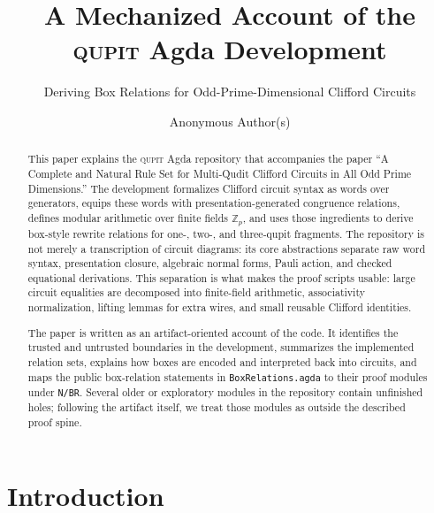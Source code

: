 \documentclass[sigplan,screen,review,anonymous]{acmart}
\newcommand{\Agda}{Agda\xspace}
\newcommand{\Qupit}{\textsc{qupit}\xspace}
\newcommand{\Zp}{\mathbb{Z}_p}
\newcommand{\file}[1]{\texttt{#1}}
\begin{document}
\title{A Mechanized Account of the \Qupit Agda Development}
\subtitle{Deriving Box Relations for Odd-Prime-Dimensional Clifford Circuits}

\author{Anonymous Author(s)}

\begin{abstract}
This paper explains the \Qupit \Agda repository that accompanies the
paper ``A Complete and Natural Rule Set for Multi-Qudit Clifford
Circuits in All Odd Prime Dimensions.''  The development formalizes
Clifford circuit syntax as words over generators, equips these words
with presentation-generated congruence relations, defines modular
arithmetic over finite fields \(\Zp\), and uses those ingredients to
derive box-style rewrite relations for one-, two-, and three-qupit
fragments.  The repository is not merely a transcription of circuit
diagrams: its core abstractions separate raw word syntax, presentation
closure, algebraic normal forms, Pauli action, and checked equational
derivations.  This separation is what makes the proof scripts usable:
large circuit equalities are decomposed into finite-field arithmetic,
associativity normalization, lifting lemmas for extra wires, and
small reusable Clifford identities.

The paper is written as an artifact-oriented account of the code.  It
identifies the trusted and untrusted boundaries in the development,
summarizes the implemented relation sets, explains how boxes are
encoded and interpreted back into circuits, and maps the public
box-relation statements in \file{BoxRelations.agda} to their proof
modules under \file{N/BR}.  Several older or exploratory modules in
the repository contain unfinished holes; following the artifact itself,
we treat those modules as outside the described proof spine.
\end{abstract}



\maketitle

\section{Introduction}
\end{document}
